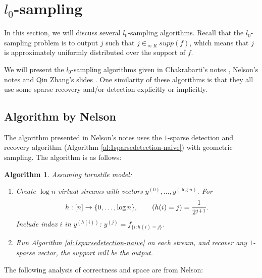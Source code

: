 \documentclass[11pt]{article}
\theoremstyle{plain}
\newtheorem{algorithm}{Algorithm}[section]
\let\Pr\relax
\DeclareMathOperator*{\Pr}{\mathbb{P}}
\begin{document}
\section{$l_0$-sampling}
In this section, we will discuss several $l_0$-sampling algorithms. Recall that 
the $l_0$-sampling 
problem is to output $j$ such that $j\in_{\approx R} supp(f)$, which means that 
$j$ is approximately uniformly distributed over the support of $f$.

We will present the $l_0$-sampling algorithms given in Chakrabarti's notes  
\cite{Cha2015-notes}, Nelson's notes \cite{Nel2015-web} and Qin Zhang's 
slides  
\cite{zhang2017-slides}. One similarity of these algorithms is that they all use 
some sparse recovery and/or detection explicitly or implicitly. 

\subsection{Algorithm by Nelson}
The algorithm presented in Nelson's notes \cite{Nel2015-web} uses the 
$1$-sparse detection and recovery algorithm (Algorithm 
\ref{al:1sparsedetection-naive}) with geometric sampling. The algorithm is as 
follows:

\begin{algorithm}
\label{al:l0sampling-nelson}
Assuming turnstile model:
\begin{enumerate}
	\item Create $\log n$ virtual streams with vectors $y^{(0)},\ldots,y^{(\log n)}$. 
	For
	\[
	h:[n]\to\{0,\ldots,\log n\},\qquad\Pr(h(i)=j)=\frac{1}{2^{j+1}}.
	\]
	Include index $i$ in $y^{(h(i))}$:  $y^{(j)}=f_{\{i:h(i)=j\}}$.
	\item Run Algorithm \ref{al:1sparsedetection-naive} on each stream, and 
	recover any $1$-sparse vector, the support will be the output.
\end{enumerate}
\end{algorithm}

The following analysis of correctness and space are from Nelson:
\end{document}
